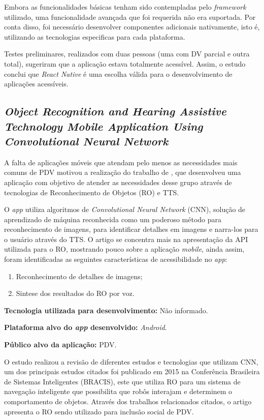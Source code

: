 Embora as funcionalidades básicas tenham sido contempladas pelo \emph{framework} utilizado, uma funcionalidade avançada que foi requerida não era suportada.
Por conta disso, foi necessário desenvolver componentes adicionais nativamente, isto é, utilizando as tecnologias especificas para cada plataforma.

Testes preliminares, realizados com duas pessoas (uma com DV parcial e outra total), sugeriram que a aplicação estava totalmente acessível.
Assim, o estudo conclui que \emph{React Native} é uma escolha válida para o desenvolvimento de aplicações acessíveis.

\subsection{\emph{Object Recognition and Hearing Assistive Technology Mobile Application Using Convolutional Neural Network}}

A falta de aplicações móveis que atendam pelo menos as necessidades mais comuns de PDV motivou a realização do trabalho de , que desenvolveu uma aplicação com objetivo de atender as necessidades desse grupo através de tecnologias de Reconhecimento de Objetos (RO) e TTS\@.

O \emph{app} utiliza algoritmos de \emph{Convolutional Neural Network} (CNN), solução de aprendizado de máquina reconhecida como um poderoso método para reconhecimento de imagens, para identificar detalhes em imagens e narra-los para o usuário através do TTS\@.
O artigo se concentra mais na apresentação da API utilizada para o RO, mostrando pouco sobre a aplicação \emph{mobile}, ainda assim, foram identificadas as seguintes características de acessibilidade no \emph{app}:

\begin{enumerate}
    \item Reconhecimento de detalhes de imagens;
    \item Sintese dos resultados do RO por voz.
\end{enumerate}

\textbf{Tecnologia utilizada para desenvolvimento:} Não informado.

\textbf{Plataforma alvo do \emph{app} desenvolvido:} \emph{Android}.

\textbf{Público alvo da aplicação:} PDV\@.

O estudo realizou a revisão de diferentes estudos e tecnologias que utilizam CNN, um dos principais estudos citados foi publicado em 2015 na Conferência Brasileira de Sistemas Inteligentes (BRACIS), este que utiliza RO para um sistema de navegação inteligente que possibilita que robôs interajam e determinem o comportamento de objetos.
Através dos trabalhos relacionados citados, o artigo apresenta o RO sendo utilizado para inclusão social de PDV\@.

